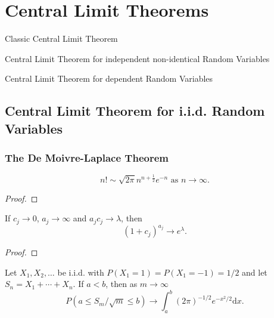 \chapter{Central Limit Theorems}

\begin{introduction}
    \item Classic Central Limit Theorem
    \item Central Limit Theorem for independent non-identical Random Variables
    \item Central Limit Theorem for dependent Random Variables
\end{introduction}

\section{Central Limit Theorem for i.i.d. Random Variables}

\subsection{The De Moivre-Laplace Theorem}

\begin{lemma} \label{lem:stirling}
    \begin{equation}
        n ! \sim \sqrt{2 \pi} n^{n+\frac{1}{2}} e^{-n} \text{ as } n \rightarrow \infty.
    \end{equation}
\end{lemma}

\begin{proof}

\end{proof}

\begin{lemma} \label{lem:exp}
    If $c_j\rightarrow 0$, $a_j\rightarrow\infty$ and $a_jc_j\rightarrow\lambda$, then
    \begin{equation}
        \left(1+c_j\right)^{a_j}\rightarrow e^\lambda.
    \end{equation}
\end{lemma}

\begin{proof}

\end{proof}

\begin{theorem} \label{thm:de-moivre-laplace}
    Let $X_{1}, X_{2}, \ldots$ be i.i.d. with $P\left(X_{1}=1\right)=P\left(X_{1}=-1\right)=1 / 2$ and let $S_{n}=X_{1}+\cdots+X_{n}$. If $a<b$, then as $m \rightarrow \infty$
    \begin{equation}
        P\left(a \leq S_{m} / \sqrt{m} \leq b\right) \rightarrow \int_{a}^{b}(2 \pi)^{-1 / 2} e^{-x^{2} / 2} \mathrm{d} x.
    \end{equation}
\end{theorem}

